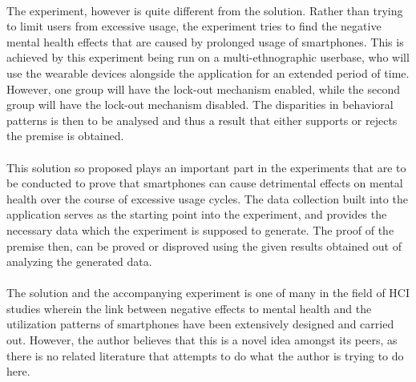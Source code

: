 \documentclass{article}
\begin{document}
\paragraph{} The experiment, however is quite different from the solution. Rather than trying to limit users from excessive usage, the experiment tries to find the negative mental health effects that are caused by prolonged usage of smartphones. This is achieved by this experiment being run on a multi-ethnographic userbase, who will use the wearable devices alongside the application for an extended period of time. However, one group will have the lock-out mechanism enabled, while the second group will have the lock-out mechanism disabled. The disparities in behavioral patterns is then to be analysed and thus a result that either supports or rejects the premise is obtained.

\paragraph{} This solution so proposed plays an important part in the experiments that are to be conducted to prove that smartphones can cause detrimental effects on mental health over the course of excessive usage cycles. The data collection built into the application serves as the starting point into the experiment, and provides the necessary data which the experiment is supposed to generate. The proof of the premise then, can be proved or disproved using the given results obtained out of analyzing the generated data.

\paragraph{} The solution and the accompanying experiment is one of many in the field of HCI studies wherein the link between negative effects to mental health and the utilization patterns of smartphones have been extensively designed and carried out. However, the author believes that this is a novel idea amongst its peers, as there is no related literature that attempts to do what the author is trying to do here.
\end{document}
